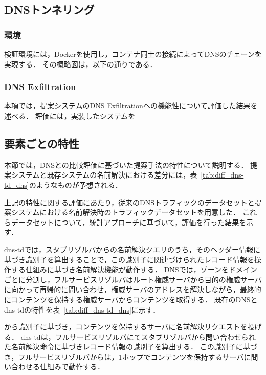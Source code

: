 \subsection{DNSトンネリング}
\label{sec:eval-tunnel}
\subsubsection{環境}
検証環境には，Dockerを使用し，コンテナ同士の接続によってDNSのチェーンを実現する．
その概略図は，以下の通りである．


\subsubsection{DNS Exfiltration}
本項では，提案システムのDNS Exfiltrationへの機能性について評価した結果を述べる．
評価には，実装したシステムを


\subsection{要素ごとの特性}
\label{sec:eval-feature}
本節では，DNSとの比較評価に基づいた提案手法の特性について説明する．
提案システムと既存システムの名前解決における差分には，表~\ref{tab:diff_dns-td_dns}のようなものが予想される．



上記の特性に関する評価にあたり，従来のDNSトラフィックのデータセットと提案システムにおける名前解決時のトラフィックデータセットを用意した．
これらデータセットについて，統計アプローチに基づいて，評価を行った結果を示す．

dns-tdでは，スタブリゾルバからの名前解決クエリのうち，そのヘッダー情報に基づき識別子を算出することで，この識別子に関連づけられたレコード情報を操作する仕組みに基づき名前解決機能が動作する．
DNSでは，ゾーンをドメインごとに分割し，フルサービスリゾルバはルート権威サーバから目的の権威サーバに向かって再帰的に問い合わせ，権威サーバのアドレスを解決しながら，最終的にコンテンツを保持する権威サーバからコンテンツを取得する．
既存のDNSとdns-tdの特性を表~\ref{tab:diff_dns-td_dns}に示す．


から識別子に基づき，コンテンツを保持するサーバに名前解決リクエストを投げる．
dns-tdは，フルサービスリゾルバにてスタブリゾルバから問い合わせられた名前解決命令に基づきレコード情報の識別子を算出する．
この識別子に基づき，フルサービスリゾルバからは，1ホップでコンテンツを保持するサーバに問い合わせる仕組みで動作する．
